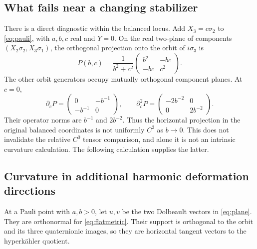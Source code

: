 \subsection{What fails near a changing stabilizer}
There is a direct diagnostic within the balanced locus. Add
$X_3=c\sigma_2$ to \eqref{eq:pauli}, with $a,b,c$ real and
$Y=0$. On the real two-plane of components
$(X_2\sigma_2,X_3\sigma_1)$, the orthogonal projection onto the
orbit of $i\sigma_3$ is
\begin{equation}\label{eq:projector}
 P(b,c)=\frac1{b^2+c^2}
 \begin{pmatrix}b^2&-bc\\-bc&c^2\end{pmatrix}.
\end{equation}
The other orbit generators occupy mutually orthogonal component
planes. At $c=0$,
\begin{equation}\label{eq:projectorderivatives}
 \partial_cP=\begin{pmatrix}0&-b^{-1}\\-b^{-1}&0\end{pmatrix},
 \qquad
 \partial_c^2P=\begin{pmatrix}-2b^{-2}&0\\0&2b^{-2}\end{pmatrix}.
\end{equation}
Their operator norms are $b^{-1}$ and $2b^{-2}$. Thus the
horizontal projection in the original balanced coordinates is not
uniformly $C^2$ as $b\to0$. This does not invalidate the relative
$C^0$ tensor comparison, and alone it is not an intrinsic curvature
calculation. The following calculation supplies the latter.

\subsection{Curvature in additional harmonic deformation directions}
At a Pauli point with $a,b>0$, let $u,v$ be the two Dolbeault
vectors in \eqref{eq:plane}. They are orthonormal for
\eqref{eq:flatmetric}. Their support is orthogonal to the orbit
and its three quaternionic images, so they are horizontal tangent
vectors to the hyperk\"ahler quotient.


